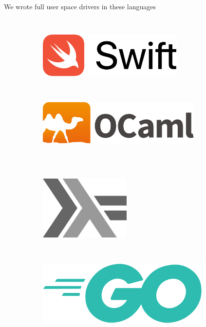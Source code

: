 \documentclass[NET,english,aspectratio=169,notitleframe]{tumbeamer}
\begin{document}
\begin{frame}{We wrote full user space drivers in these languages}
\begin{figure}
    \centering

    \begin{subfigure}[t]{0.2\textwidth}
        \centering
    \end{subfigure}
    ~ 
    \begin{subfigure}[t]{0.3\textwidth}
        \centering
        \includegraphics[width=0.8\textwidth]{pics/swift}
    \end{subfigure}
    ~ 
    \begin{subfigure}[t]{0.3\textwidth}
        \centering
        \includegraphics[width=0.9\textwidth]{pics/ocaml}
    \end{subfigure}
    \\
    \vspace{2.5em}
    \centering
    ~ 
    \begin{subfigure}[t]{0.2\columnwidth}
        \centering
        \includegraphics[width=0.5\textwidth]{pics/haskell}
    \end{subfigure}
    ~ 
    \begin{subfigure}[t]{0.2\columnwidth}
        \centering
        \includegraphics[width=0.95\textwidth]{pics/go}

\end{subfigure}
\end{figure}
\end{frame}
\end{document}
